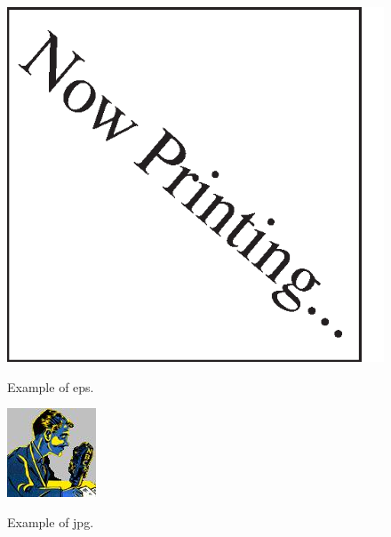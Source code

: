 \documentclass[twocolumn]{d-abst}
\begin{document}
\begin{figure}[tbh]
 \begin{center}
  \begin{minipage}{0.3\columnwidth}
   \includegraphics[width=\columnwidth]{nowprinting.eps}
   \caption{Example of eps.}
  \end{minipage}
  \hspace{0.15\columnwidth}
  \begin{minipage}{0.3\columnwidth}
   \includegraphics[width=\columnwidth]{dj.jpg}
   \caption{Example of jpg.}
  \end{minipage}
  \label{figure:nowprinting}
 \end{center}
\end{figure}
\end{document}

